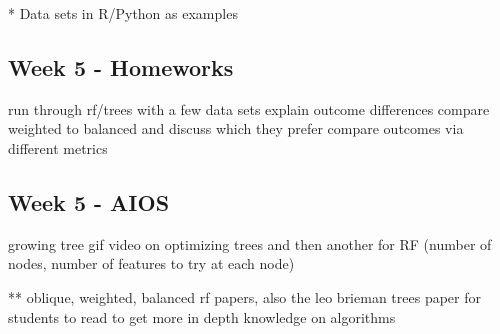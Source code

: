 \documentclass[a4paper]{article}
\begin{document}
* Data sets in R/Python as examples

\subsection{Week 5 - Homeworks}
run through rf/trees with a few data sets
explain outcome differences
compare weighted to balanced and discuss which they prefer
compare outcomes via different metrics

\subsection{Week 5 - AIOS}
growing tree gif
video on optimizing trees and then another for RF (number of  nodes, number of features to try at each node)

** oblique, weighted, balanced rf papers, also the leo brieman trees paper for students to read to get more in depth knowledge on algorithms
\end{document}

